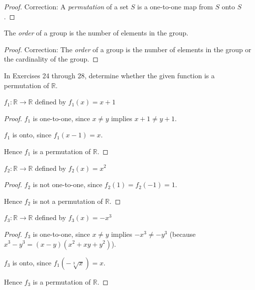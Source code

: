 \begin{proof}
    Correction:  A \textit{permutation} of a set $S$ is a one-to-one map from $S$ onto $S$.
\end{proof}

\newpage
\begin{exercise}
    The \textit{order} of a group is the number of elements in the group.
\end{exercise}

\begin{proof}
    Correction: The \textit{order} of a group is the number of elements in the group or the cardinality of the group.
\end{proof}

In Exercises 24 through 28, determine whether the given function is a permutation of $\mathbb{R}$.

\newpage
\begin{exercise}
    $f_{1}: \mathbb{R} \to \mathbb{R}$ defined by $f_{1}(x) = x + 1$
\end{exercise}

\begin{proof}
    $f_{1}$ is one-to-one, since $x\ne y$ implies $x+1\ne y+1$.

    $f_{1}$ is onto, since $f_{1}(x - 1) = x$.

    Hence $f_{1}$ is a permutation of $\mathbb{R}$.
\end{proof}

\newpage
\begin{exercise}
    $f_{2}: \mathbb{R} \to \mathbb{R}$ defined by $f_{2}(x) = x^{2}$
\end{exercise}

\begin{proof}
    $f_{2}$ is not one-to-one, since $f_{2}(1) = f_{2}(-1) = 1$.

    Hence $f_{2}$ is not a permutation of $\mathbb{R}$.
\end{proof}

\newpage
\begin{exercise}
    $f_{3}: \mathbb{R} \to \mathbb{R}$ defined by $f_{3}(x) = -x^{3}$
\end{exercise}

\begin{proof}
    $f_{3}$ is one-to-one, since $x\ne y$ implies $-x^{3} \ne -y^{3}$ (because $x^{3} - y^{3} = (x - y)(x^{2} + xy + y^{2})$).

    $f_{3}$ is onto, since $f_{1}(-\sqrt[3]{x}) = x$.

    Hence $f_{3}$ is a permutation of $\mathbb{R}$.
\end{proof}

